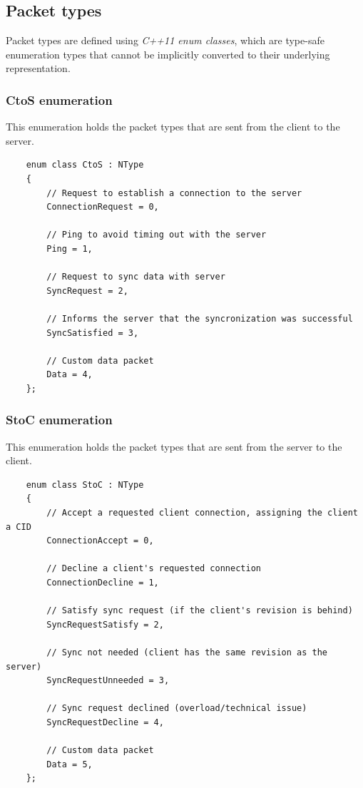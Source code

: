 \documentclass{report}
\begin{document}
            \subsection{Packet types}
                Packet types are defined using \emph{C++11 enum classes}, which are type-safe enumeration types that cannot be implicitly converted to their underlying representation.

                \subsubsection{CtoS enumeration}
                    This enumeration holds the packet types that are sent from the client to the server.

                    \begin{verbatim}
    enum class CtoS : NType
    {
        // Request to establish a connection to the server
        ConnectionRequest = 0,      
        
        // Ping to avoid timing out with the server
        Ping = 1,                   

        // Request to sync data with server
        SyncRequest = 2,            
        
        // Informs the server that the syncronization was successful
        SyncSatisfied = 3,         

        // Custom data packet
        Data = 4,                   
    };
                    \end{verbatim}

                \subsubsection{StoC enumeration}
                    This enumeration holds the packet types that are sent from the server to the client.

                    \begin{verbatim}
    enum class StoC : NType
    {
        // Accept a requested client connection, assigning the client a CID
        ConnectionAccept = 0,       
        
        // Decline a client's requested connection
        ConnectionDecline = 1,      

        // Satisfy sync request (if the client's revision is behind)
        SyncRequestSatisfy = 2,     

        // Sync not needed (client has the same revision as the server)
        SyncRequestUnneeded = 3,    

        // Sync request declined (overload/technical issue)
        SyncRequestDecline = 4,     

        // Custom data packet
        Data = 5,                   
    };
                    \end{verbatim}
            
\end{document}
